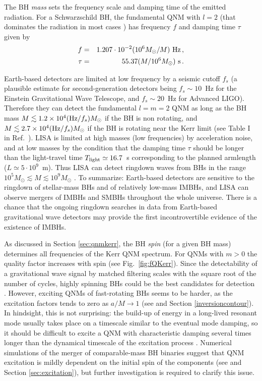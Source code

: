 \documentclass[]{iopart}
\def\beq{\begin{eqnarray}}
\def\eeq{\end{eqnarray}}
\begin{document}
The BH {\em mass} sets the frequency scale and damping time of the emitted
radiation. For a Schwarzschild BH, the fundamental QNM with $l=2$ (that
dominates the radiation in most cases \cite{Flanagan:1997sx}) has frequency
$f$ and damping time $\tau$ given by
%
\beq\label{QNMestimate}
f&=&1.207\cdot 10^{-2}(10^6M_\odot/M)~{\rm Hz}\,,\\
\tau&=&55.37(M/10^6M_\odot)~{\rm s}\,.
\eeq

Earth-based detectors are limited at low frequency by a seismic cutoff $f_s$
(a plausible estimate for second-generation detectors being $f_s\sim 10$~Hz
for the Einstein Gravitational Wave Telescope, and $f_s\sim 20$~Hz for
Advanced LIGO).
%
Therefore they can detect the fundamental $l=m=2$ QNM as long as the BH mass
$M\lesssim 1.2\times 10^4 ({\rm Hz}/f_s)M_\odot$ if the BH is non rotating,
and $M\lesssim 2.7\times 10^4 ({\rm Hz}/f_s)M_\odot$ if the BH is rotating
near the Kerr limit (see Table I in Ref.~\cite{Berti:2007zu}). LISA is limited
at high masses (low frequencies) by acceleration noise, and at low masses by
the condition that the damping time $\tau$ should be longer than the
light-travel time $T_{\rm light}\simeq 16.7$~s corresponding to the planned
armlength ($L\simeq 5\cdot 10^9$~m). Thus LISA can detect ringdown waves from
BHs in the range $10^5M_\odot\lesssim M\lesssim 10^9M_\odot$
\cite{Berti:2005ys}. To summarize: Earth-based detectors are sensitive to the
ringdown of stellar-mass BHs and of relatively low-mass IMBHs, and LISA can
observe mergers of IMBHs and SMBHs throughout the whole universe. There is a
chance that the ongoing ringdown searches in data from Earth-based
gravitational wave detectors
\cite{Creighton:1999pm,Goggin:2006bs,Abbott:2009km,Nakano:2003ma,Nakano:2004ib,Tsunesada:2004ft,Tsunesada:2005fe}
may provide the first incontrovertible evidence of the existence of IMBHs.

As discussed in Section \ref{sec:qnmkerr}, the BH {\em spin} (for a given BH
mass) determines all frequencies of the Kerr QNM spectrum. For QNMs with $m>0$
the quality factor increases with spin (see Fig.~\ref{fig:fQKerr}).  Since the
detectability of a gravitational wave signal by matched filtering scales with
the square root of the number of cycles, highly spinning BHs could be the best
candidates for detection \cite{Flanagan:1997sx}.  However, exciting QNMs of
fast-rotating BHs seems to be harder, as the excitation factors tends to zero
as $a/M\to 1$ (see \cite{Ferrari:1984zz,Berti:2006wq} and Section
\ref{inversioncontour}).  In hindsight, this is not surprising: the build-up
of energy in a long-lived resonant mode usually takes place on a timescale
similar to the eventual mode damping, so it should be difficult to excite a
QNM with characteristic damping several times longer than the dynamical
timescale of the excitation process \cite{Glampedakis:2001js}. Numerical
simulations of the merger of comparable-mass BH binaries suggest that QNM
excitation is mildly dependent on the initial spin of the components (see
\cite{Berti:2007nw} and Section \ref{sec:excitation}), but further
investigation is required to clarify this issue.
\end{document}
